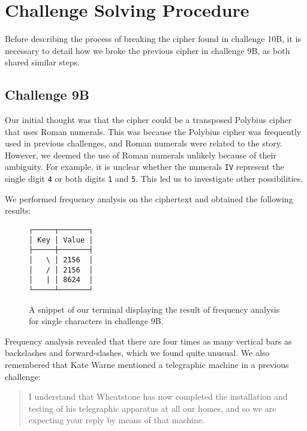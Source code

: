 \section*{Challenge Solving Procedure}

Before describing the process of breaking the cipher found in challenge 10B, it is necessary to detail how we broke the previous cipher in challenge 9B, as both shared similar steps.

\subsection*{Challenge 9B}

Our initial thought was that the cipher could be a transposed Polybius cipher that uses Roman numerals. This was because the Polybius cipher was frequently used in previous challenges, and Roman numerals were related to the story. However, we deemed the use of Roman numerals unlikely because of their ambiguity. For example, it is unclear whether the numerals \texttt{IV} represent the single digit \texttt{4} or both digits \texttt{1} and \texttt{5}. This led us to investigate other possibilities.

We performed frequency analysis on the ciphertext and obtained the following results:

\begin{figure}[H]
\centering
\begin{minipage}{15ex}
\begin{verbatim}        
┌─────┬───────┐
│ Key │ Value │
├─────┼───────┤
│   \ │ 2156  │
│   / │ 2156  │
│   | │ 8624  │
└─────┴───────┘      
\end{verbatim}
\end{minipage}
\label{fig:char_count_9b}
\caption{A snippet of our terminal displaying the result of frequency analysis for single characters in challenge 9B.}
\end{figure}

Frequency analysis revealed that there are four times as many vertical bars as backslashes and forward-slashes, which we found quite unusual. We also remembered that Kate Warne mentioned a telegraphic machine in a previous challenge:

\begin{quote}\ttfamily
I understand that Wheatstone has now completed the installation and testing of his telegraphic apparatus at all our homes, and so we are expecting your reply by means of that machine.    
\end{quote}

